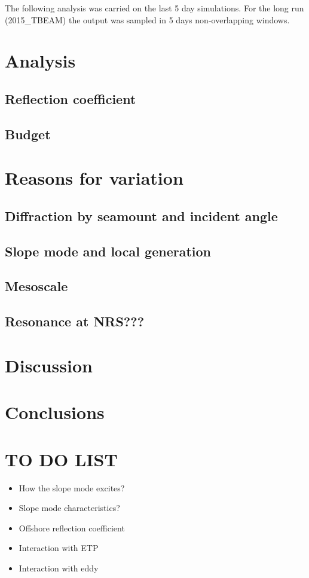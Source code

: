 The following analysis was carried on the last 5 day simulations. For the long run (2015\_TBEAM) the output was sampled in 5 days non-overlapping windows.\\

\section{Analysis}
\subsection{Reflection coefficient}
\begin{figure}
\end{figure}

\subsection{Budget}
\begin{figure}
\end{figure}

\section{Reasons for variation}
\subsection{Diffraction by seamount and incident angle}
\subsection{Slope mode and local generation}
\subsection{Mesoscale}
\subsection{Resonance at NRS???}

\section{Discussion}
\section{Conclusions}

\newpage
\section*{TO DO LIST}
\begin{itemize}
\item How the slope mode excites?
\item Slope mode characteristics?
\item Offshore reflection coefficient
\item Interaction with ETP
\item Interaction with eddy
\end{itemize}




